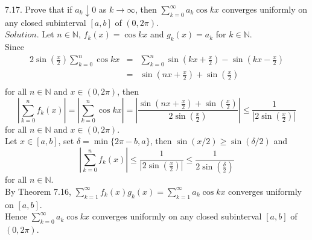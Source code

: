 \documentclass[12pt]{book}
\begin{document}
\begin{CJK}{UTF8}{bsmi}
7.17. Prove that if $a_k \downarrow 0$ as $k \rightarrow \infty$, then $\sum_{k=0}^\infty a_k \cos kx$ converges uniformly on any closed subinterval $\left[ a, b \right]$ of $(0, 2\pi)$. \\
$Solution$. Let $n\in\mathbb{N}$, $f_k(x) = \cos kx$ and $g_k(x) = a_k$ for $k\in\mathbb{N}$. \\
Since 
\begin{eqnarray*}
2\sin\left( \frac{x}{2} \right)\sum_{k=0}^n\cos kx
    & = & \sum_{k=0}^n \sin\left( kx+\frac{x}{2} \right) - \sin\left( kx-\frac{x}{2} \right) \\
    & = & \sin\left( nx+\frac{x}{2} \right) + \sin\left( \frac{x}{2} \right) \\
\end{eqnarray*}
for all $n\in\mathbb{N}$ and $x\in(0, 2\pi)$, then 
\[
    \left| \sum_{k=0}^n f_k(x) \right|
    = \left| \sum_{k=0}^n\cos kx \right|
    = \left| \frac{\sin\left( nx+\frac{x}{2} \right) + \sin\left( \frac{x}{2} \right)}{2\sin\left( \frac{x}{2} \right)} \right|
    \le \frac{1}{\left| 2\sin\left( \frac{x}{2} \right) \right|}
\]
for all $n\in\mathbb{N}$ and $x\in(0, 2\pi)$. \\
Let $x\in\left[ a, b \right]$, set $\delta = \min\{2\pi-b, a\}$, then $\sin(x/2)\ge\sin(\delta/2)$ and
\[
    \left| \sum_{k=0}^n f_k(x) \right|
    \le \frac{1}{\left| 2\sin\left( \frac{x}{2} \right) \right|}
    \le \frac{1}{2\sin\left( \frac{\delta}{2} \right)}
\]
for all $n\in\mathbb{N}$. \\
By Theorem 7.16, $\sum_{k=1}^\infty f_k(x)g_k(x) = \sum_{k=1}^\infty a_k \cos kx$ converges uniformly on $\left[ a, b \right]$. \\
Hence $\sum_{k=0}^\infty a_k \cos kx$ converges uniformly on any closed subinterval $\left[ a, b \right]$ of $(0, 2\pi)$. \\

\end{CJK}
\end{document}
